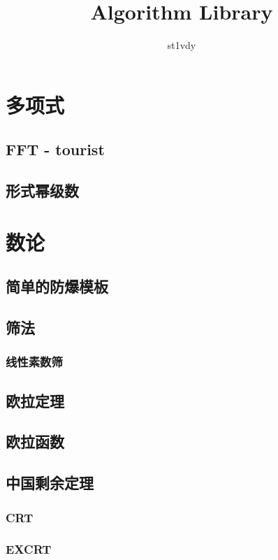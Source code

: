 \documentclass{article}
\title{Algorithm Library}
\author{st1vdy}
\begin{document}
\begin{titlepage}
\maketitle
\thispagestyle{empty}
\pagebreak
\pagestyle{plain}
\tableofcontents
\end{titlepage}
\newpage %
\section{多项式} %
\subsection{FFT - tourist}

\subsection{形式幂级数}

\section{数论}
\subsection{简单的防爆模板}

\subsection{筛法}
\subsubsection{线性素数筛}

\subsection{欧拉定理}
\subsection{欧拉函数}
\subsection{中国剩余定理}
\subsubsection{CRT}
\subsubsection{EXCRT}
\end{document}
